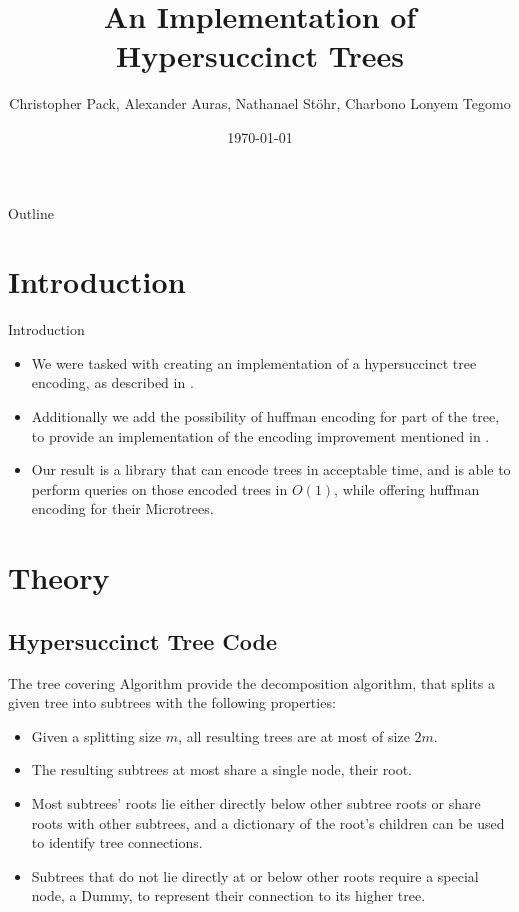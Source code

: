 \documentclass{beamer}
\title[An Implementation of Hypersuccinct Trees]
{An Implementation of Hypersuccinct Trees}
\author{Christopher Pack, Alexander Auras, Nathanael Stöhr, Charbono Lonyem Tegomo}
\institute[Universität Siegen]
{
  Lehrstuhl für theoretische Informatik\\
  Universität Siegen}
\date{\today}
\begin{document}
\begin{frame}
  \titlepage
\end{frame}

\begin{frame}{Outline}
  \tableofcontents
\end{frame}

\section[Introduction]{Introduction}

\begin{frame}{Introduction}
	\begin{itemize}
	\item
	We were tasked with creating an implementation of a hypersuccinct tree encoding, as described in \cite{farzanMunro}.
	\item
	Additionally we add the possibility of huffman encoding for part of the tree, to provide an implementation of the encoding improvement mentioned in \cite{universalSuccinct}.
	\item
	Our result is a library that can encode trees in acceptable time, and is able to perform queries on those encoded trees in $O(1)$, while offering huffman encoding for their Microtrees.
	\end{itemize}
\end{frame}

\section{Theory}

\subsection[Hypersuccinct Tree Code]{Hypersuccinct Tree Code}

\begin{frame}{The tree covering Algorithm} %
	\cite{farzanMunro} provide the decomposition algorithm, that splits a given tree into subtrees with the following properties:
\begin{itemize}
	\item
		Given a splitting size $m$, all resulting trees are at most of size $2m$.
	\item
		The resulting subtrees at most share a single node, their root.
	\item
		Most subtrees' roots lie either directly below other subtree roots or share roots with other subtrees, and a dictionary of the root's children can be used to identify tree connections.
	\item
		Subtrees that do not lie directly at or below other roots require a special node, a Dummy, to represent their connection to its higher tree.
	\end{itemize}
\end{frame}
\end{document}
